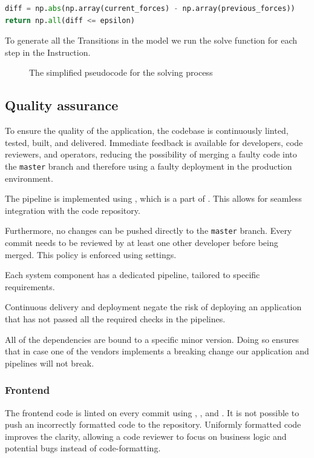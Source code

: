 \begin{lstlisting}[language=Python]
diff = np.abs(np.array(current_forces) - np.array(previous_forces))
return np.all(diff <= epsilon)
\end{lstlisting}

To generate all the Transitions in the model we run the solve function for each step in the Instruction.

\begin{figure}[H]
	\caption{The simplified pseudocode for the solving process}
	
\end{figure}


\subsection{Quality assurance}

To ensure the quality of the application, the codebase is continuously linted, tested, built, and delivered. Immediate feedback is available for developers, code reviewers, and operators, reducing the possibility of merging a faulty code into the \texttt{master} branch and therefore using a faulty deployment in the production environment.

\medskip
The pipeline is implemented using , which is a part of . This allows for seamless integration with the code repository.

\medskip
Furthermore, no changes can be pushed directly to the \texttt{master} branch. Every commit needs to be reviewed by at least one other developer before being merged. This policy is enforced using  settings.

\medskip
Each system component has a dedicated pipeline, tailored to specific requirements. 

\medskip
Continuous delivery and deployment negate the risk of deploying an application that has not passed all the required checks in the pipelines.

\medskip
All of the dependencies are bound to a specific minor version. Doing so ensures that in case one of the vendors implements a breaking change our application and pipelines will not break.

\subsubsection{Frontend}

The frontend code is linted on every commit using , , and . It is not possible to push an incorrectly formatted code to the repository.
Uniformly formatted code improves the clarity, allowing a code reviewer to focus on business logic and potential bugs instead of code-formatting.

